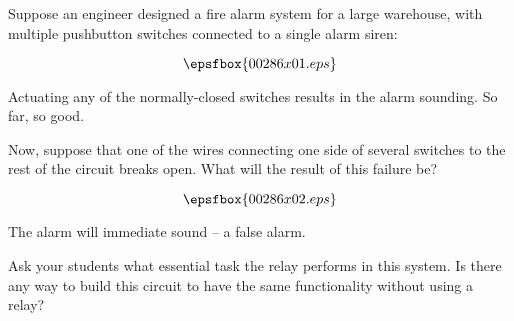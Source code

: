 

Suppose an engineer designed a fire alarm system for a large warehouse, with multiple pushbutton switches connected to a single alarm siren:

$$\epsfbox{00286x01.eps}$$

Actuating any of the normally-closed switches results in the alarm sounding.  So far, so good.

Now, suppose that one of the wires connecting one side of several switches to the rest of the circuit breaks open.  What will the result of this failure be?

$$\epsfbox{00286x02.eps}$$







The alarm will immediate sound -- a false alarm.







Ask your students what essential task the relay performs in this system.  Is there any way to build this circuit to have the same functionality without using a relay?





